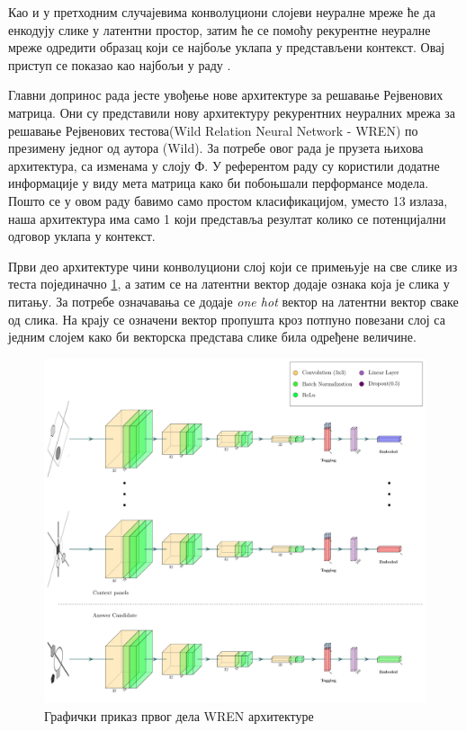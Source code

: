 \documentclass[a4paper, 12pt, master, utf8]{etf}
\begin{document}
Као и у претходним случајевима конволуциони слојеви неуралне мреже ће да 
енкодују слике у латентни простор, затим ће се помоћу рекурентне неуралне мреже одредити образац који се најбоље уклапа у представљени контекст. Овај приступ се показао као најбољи у раду \cite{barrett_measuring_2018}.
\newline

Главни допринос рада \cite{barrett_measuring_2018} јесте увођење нове архитектуре за решавање Рејвенових матрица. Они су представили 
нову архитектуру рекурентних неуралних мрежа за решавање Рејвенових тестова(Wild Relation Neural Network - WREN) по презимену једног од аутора (Wild).
За потребе овог рада је прузета њихова архитектура, са изменама у слоју Ф. У референтом раду су користили додатне информације у виду мета матрица како би побоњшали перформансе модела. 
Пошто се у овом раду бавимо само простом класификацијом, уместо 13 излаза, наша архитектура има само 1 који представља резултат колико се потенцијални одговор уклапа у контекст.
\newline

Први део архитектуре чини конволуциони слој који се примењује на све слике из теста појединачно \ref{fig:wren1}, а затим се на латентни вектор додаје ознака која је слика у питању. 
За потребе означавања се додаје \textit{one hot} вектор на латентни вектор сваке од слика. На крају се означени вектор пропушта кроз потпуно повезани слој са једним слојем како би векторска представа слике била одређене величине.
\newline

\begin{figure}[H]
    \centering
    \includegraphics[width=\textwidth]{arhitekture/wren1.pdf}
    \caption{Графички приказ првог дела WREN архитектуре}
    \label{fig:wren1}
\end{figure}
\end{document}
